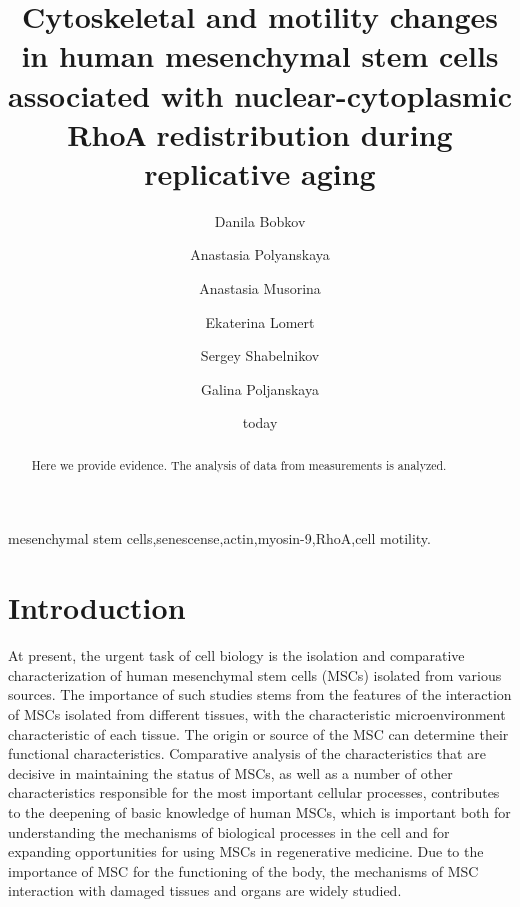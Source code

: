 \documentclass[english,authoryear]{elsarticle}
\title{Cytoskeletal and motility changes in human mesenchymal stem cells associated with nuclear-cytoplasmic RhoА redistribution during replicative aging}
\begin{document}
\date{today}

\author[rvt]{Danila Bobkov}
\author[add]{Anastasia Polyanskaya}
\author[rvt]{Anastasia Musorina}
\author[rvt]{Ekaterina Lomert}
\author[rvt]{Sergey Shabelnikov}
\author[rvt]{Galina Poljanskaya}
\address[rvt]{Institute of Cytology of the Russian Academy of Science, 194064 Tikhoretsky ave. 4, St-Petersburg, Russia }
\address[add]{Centre for Study of Things}


\begin{abstract}
Here we provide evidence.
The analysis of data from measurements is analyzed.
\end{abstract}

\begin{keyword}
mesenchymal stem cells\sep senescense\sep actin\sep myosin-9\sep RhoA\sep cell motility.
\end{keyword}

\maketitle
\section{Introduction}

At present, the urgent task of cell biology is the isolation and comparative characterization of human mesenchymal stem cells (MSCs) isolated from various sources.
The importance of such studies stems from the features of the interaction of MSCs isolated from different tissues, with the characteristic microenvironment characteristic of each tissue.
The origin or source of the MSC can determine their functional characteristics.
Comparative analysis of the characteristics that are decisive in maintaining the status of MSCs, as well as a number of other characteristics responsible for the most important cellular processes, contributes to the deepening of basic knowledge of human MSCs, which is important both for understanding the mechanisms of biological processes in the cell and for expanding opportunities for using MSCs in regenerative medicine.
Due to the importance of MSC for the functioning of the body, the mechanisms of MSC interaction with damaged tissues and organs are widely studied.
\end{document}
